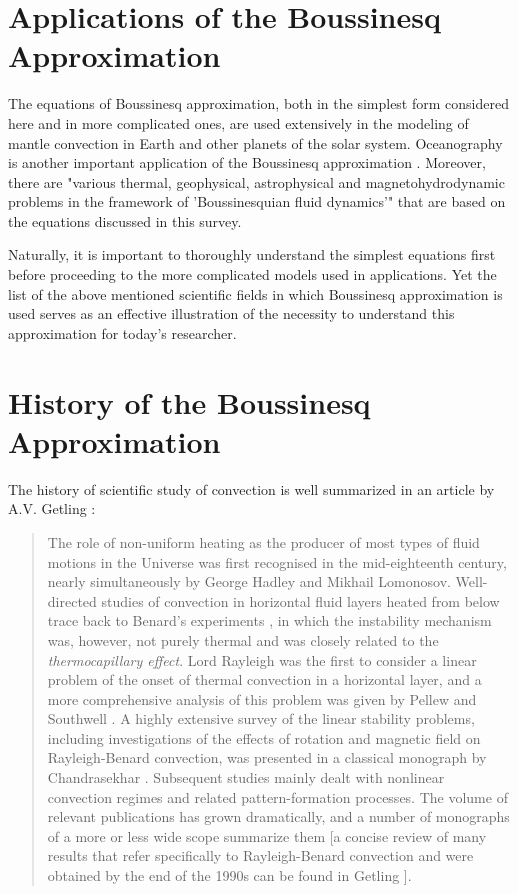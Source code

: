 \section{Applications of the Boussinesq Approximation}

The equations of Boussinesq approximation, both in the simplest form considered here and in more complicated ones, are used extensively in the modeling of mantle convection in Earth and other planets of the solar system. \cite{mantle_conv_in_earth_and_planets} Oceanography is another important application of the Boussinesq approximation \cite{miesen}. Moreover, there are "various thermal, geophysical, astrophysical and magnetohydrodynamic problems in the framework of 'Boussinesquian fluid dynamics'" that are based on the equations discussed in this survey. \cite{boussinesq_and_his_approximation} 

Naturally, it is important to thoroughly understand the simplest equations first before proceeding to the more complicated models used in applications. Yet the list of the above mentioned scientific fields in which Boussinesq approximation is used serves as an effective illustration of the necessity to understand this approximation for today's researcher.

\section{History of the Boussinesq Approximation}

The history of scientific study of convection is well summarized in an article by A.V. Getling \cite{getling_scholarpedia}:

\begin{quote}

The role of non-uniform heating as the producer of most types of fluid motions in the Universe was first recognised in the mid-eighteenth century, nearly simultaneously by George Hadley and Mikhail Lomonosov. Well-directed studies of convection in horizontal fluid layers heated from below trace back to Benard's experiments \cite{bernard}, in which the instability mechanism was, however, not purely thermal and was closely related to the \emph{thermocapillary effect}. Lord Rayleigh \cite{rayleigh} was the first to consider a linear problem of the onset of thermal convection in a horizontal layer, and a more comprehensive analysis of this problem was given by Pellew and Southwell \cite{pellew_and_southwell}. A highly extensive survey of the linear stability problems, including investigations of the effects of rotation and magnetic field on Rayleigh-Benard convection, was presented in a classical monograph by Chandrasekhar \cite{chandrasekhar}. Subsequent studies mainly dealt with nonlinear convection regimes and related pattern-formation processes. The volume of relevant publications has grown dramatically, and a number of monographs of a more or less wide scope summarize them [a concise review of many results that refer specifically to Rayleigh-Benard convection and were obtained by the end of the 1990s can be found in Getling \cite{getling}].
 
\end{quote}

